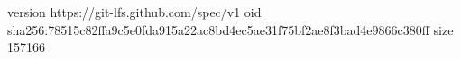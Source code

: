 version https://git-lfs.github.com/spec/v1
oid sha256:78515c82ffa9c5e0fda915a22ac8bd4ec5ae31f75bf2ae8f3bad4e9866c380ff
size 157166
